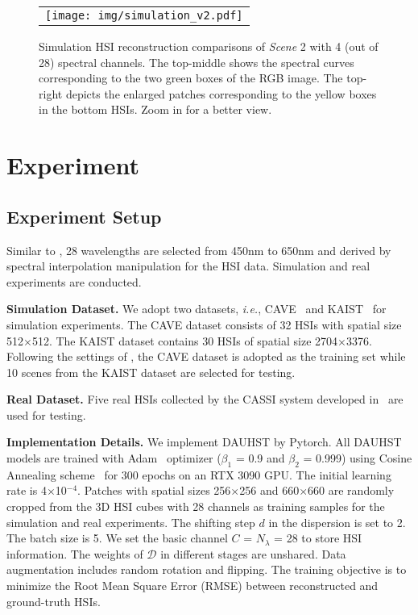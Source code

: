 \documentclass{article}
\begin{document}
\begin{figure*}[t]
	\begin{center}
		\begin{tabular}[t]{c} \hspace{-3.4mm}
			\texttt{[image: img/simulation\_v2.pdf]}
		\end{tabular}
	\end{center}
	\vspace*{-3mm}
	\caption{\small Simulation HSI reconstruction comparisons of  \emph{Scene} 2 with 4 (out of 28) spectral channels. The top-middle shows the spectral curves  corresponding to the two green boxes of the RGB image. The top-right depicts the enlarged patches corresponding to the yellow boxes in the bottom HSIs. Zoom in for a  better view.}
	\label{fig:simu}
	\vspace{-5mm}
\end{figure*}

\vspace{-1mm}
\section{Experiment} \label{sec:exp}
\vspace{-1.5mm}
\subsection{Experiment Setup}
\vspace{-0.5mm}
Similar to \cite{tsa_net,hdnet,gapnet,gsm,mst}, 28 wavelengths are selected from 450nm to 650nm and  derived by spectral interpolation manipulation for the HSI data. Simulation and real experiments are conducted. 

\textbf{Simulation Dataset.} We adopt two datasets, \emph{i.e.}, CAVE~\cite{cave} and KAIST~\cite{kaist} for simulation experiments. The CAVE  dataset consists of 32 HSIs with spatial size 512$\times$512. The KAIST dataset  contains 30 HSIs of spatial size 2704$\times$3376. Following the settings of \cite{tsa_net,hdnet,gapnet,gsm,mst}, the CAVE dataset is adopted as the training set while 10 scenes from the KAIST dataset are selected for testing. 

\textbf{Real Dataset.} Five real HSIs collected by the CASSI system developed in~\cite{tsa_net} are used for testing. 

\textbf{Implementation Details.} We implement DAUHST by Pytorch. All DAUHST models are trained with Adam~\cite{adam} optimizer ($\beta_1$ = 0.9 and $\beta_2$ = 0.999) using Cosine Annealing scheme~\cite{cosine} for 300 epochs on an RTX 3090 GPU. The initial learning rate is 4$\times$10$^{-4}$. Patches with spatial sizes 256$\times$256 and 660$\times$660 are randomly cropped from the 3D HSI cubes with 28 channels as training samples for the simulation and real experiments.  The shifting step $d$ in the dispersion is set to 2. 
The batch size is 5. We set the basic channel $C$ = $N_\lambda$ = 28 to store HSI information. The weights of $\mathcal{D}$ in different stages are unshared. Data augmentation includes  random  rotation and flipping. The training objective is to minimize the Root Mean Square Error (RMSE) between reconstructed and ground-truth HSIs.  
\end{document}
